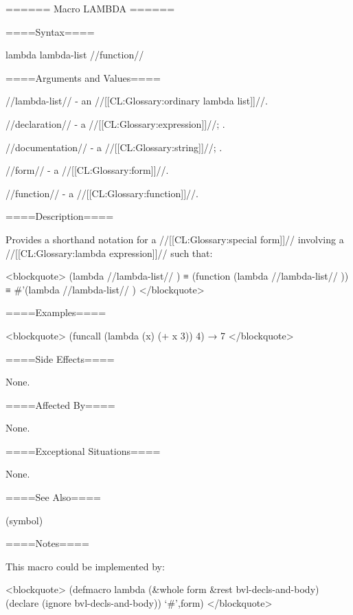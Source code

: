 ====== Macro LAMBDA ======

====Syntax====

\DefmacWithValues lambda {lambda-list {\DeclsAndDoc} } {//function//}

====Arguments and Values====

//lambda-list// - an //[[CL:Glossary:ordinary lambda list]]//.

//declaration// - a  //[[CL:Glossary:expression]]//; \noeval.

//documentation// - a //[[CL:Glossary:string]]//; \noeval.

//form// - a //[[CL:Glossary:form]]//.

//function// - a //[[CL:Glossary:function]]//.

====Description====

Provides a shorthand notation for a  //[[CL:Glossary:special form]]// involving a //[[CL:Glossary:lambda expression]]// such that:

<blockquote> (lambda //lambda-list// {\DeclsAndDoc} ) ≡ (function (lambda //lambda-list// {\DeclsAndDoc} )) ≡ #'(lambda //lambda-list// {\DeclsAndDoc} ) </blockquote>

====Examples====

<blockquote> (funcall (lambda (x) (+ x 3)) 4) → 7 </blockquote>

====Side Effects====

None.

====Affected By====

None.

====Exceptional Situations====

None.

====See Also====

 (symbol)

====Notes====

This macro could be implemented by:

<blockquote> (defmacro lambda (&whole form &rest bvl-decls-and-body) (declare (ignore bvl-decls-and-body)) `#',form) </blockquote>

